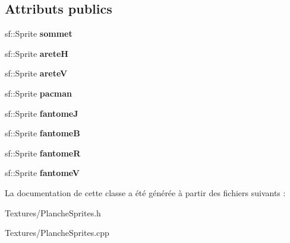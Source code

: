 \subsection*{Attributs publics}
\begin{DoxyCompactItemize}
\item 
\mbox{\label{class_planche_sprites_abf460b7e9baf0d0a04758b78ff153fe8}} 
sf\+::\+Sprite {\bfseries sommet}
\item 
\mbox{\label{class_planche_sprites_ac6020ab007435f466935a339a571ed7b}} 
sf\+::\+Sprite {\bfseries areteH}
\item 
\mbox{\label{class_planche_sprites_a7f2139ddd13cc5b7ab85e33eea0cad2b}} 
sf\+::\+Sprite {\bfseries areteV}
\item 
\mbox{\label{class_planche_sprites_adabc8c0ef2d3bc6fb7c8233cc01d1b23}} 
sf\+::\+Sprite {\bfseries pacman}
\item 
\mbox{\label{class_planche_sprites_a39ad3e1c169841dd8726cf2644c5862b}} 
sf\+::\+Sprite {\bfseries fantomeJ}
\item 
\mbox{\label{class_planche_sprites_a2b349b42d38c323e648165f261237fa4}} 
sf\+::\+Sprite {\bfseries fantomeB}
\item 
\mbox{\label{class_planche_sprites_a0d39c87363362fe0d23fff28f0b5099c}} 
sf\+::\+Sprite {\bfseries fantomeR}
\item 
\mbox{\label{class_planche_sprites_a115d9ae01765ededd8f240faf62a2ee3}} 
sf\+::\+Sprite {\bfseries fantomeV}
\end{DoxyCompactItemize}


La documentation de cette classe a été générée à partir des fichiers suivants \+:\begin{DoxyCompactItemize}
\item 
Textures/Planche\+Sprites.\+h\item 
Textures/Planche\+Sprites.\+cpp\end{DoxyCompactItemize}
